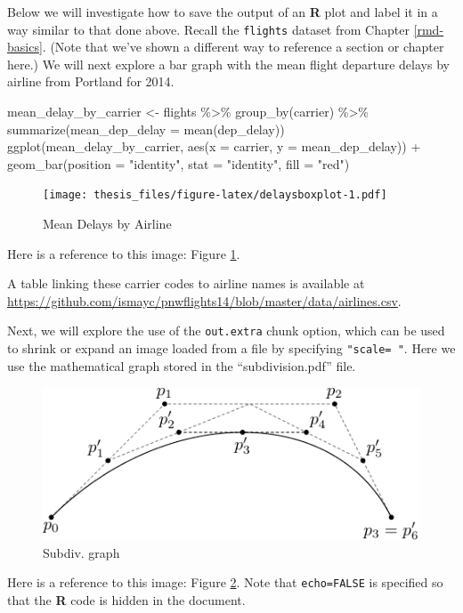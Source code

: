 \documentclass[12pt,twoside]{reedthesis}
\newenvironment{Shaded}{\begin{snugshade}}{\end{snugshade}}
\newcommand{\AttributeTok}[1]{\textcolor[rgb]{0.77,0.63,0.00}{#1}}
\newcommand{\FunctionTok}[1]{\textcolor[rgb]{0.00,0.00,0.00}{#1}}
\newcommand{\NormalTok}[1]{#1}
\newcommand{\OtherTok}[1]{\textcolor[rgb]{0.56,0.35,0.01}{#1}}
\newcommand{\SpecialCharTok}[1]{\textcolor[rgb]{0.00,0.00,0.00}{#1}}
\newcommand{\StringTok}[1]{\textcolor[rgb]{0.31,0.60,0.02}{#1}}
\begin{document}
Below we will investigate how to save the output of an \textbf{R} plot and label it in a way similar to that done above. Recall the \texttt{flights} dataset from Chapter \ref{rmd-basics}. (Note that we've shown a different way to reference a section or chapter here.) We will next explore a bar graph with the mean flight departure delays by airline from Portland for 2014.
\begin{Shaded}
\begin{Highlighting}[]
\NormalTok{mean\_delay\_by\_carrier }\OtherTok{\textless{}{-}}\NormalTok{ flights }\SpecialCharTok{\%\textgreater{}\%}
  \FunctionTok{group\_by}\NormalTok{(carrier) }\SpecialCharTok{\%\textgreater{}\%}
  \FunctionTok{summarize}\NormalTok{(}\AttributeTok{mean\_dep\_delay =} \FunctionTok{mean}\NormalTok{(dep\_delay))}
\FunctionTok{ggplot}\NormalTok{(mean\_delay\_by\_carrier, }\FunctionTok{aes}\NormalTok{(}\AttributeTok{x =}\NormalTok{ carrier, }\AttributeTok{y =}\NormalTok{ mean\_dep\_delay)) }\SpecialCharTok{+}
  \FunctionTok{geom\_bar}\NormalTok{(}\AttributeTok{position =} \StringTok{"identity"}\NormalTok{, }\AttributeTok{stat =} \StringTok{"identity"}\NormalTok{, }\AttributeTok{fill =} \StringTok{"red"}\NormalTok{)}
\end{Highlighting}
\end{Shaded}
\begin{figure}
\centering
\texttt{[image: thesis\_files/figure-latex/delaysboxplot-1.pdf]}
\caption{\label{fig:delaysboxplot}Mean Delays by Airline}
\end{figure}
Here is a reference to this image: Figure \ref{fig:delaysboxplot}.

A table linking these carrier codes to airline names is available at \url{https://github.com/ismayc/pnwflights14/blob/master/data/airlines.csv}.

\clearpage

Next, we will explore the use of the \texttt{out.extra} chunk option, which can be used to shrink or expand an image loaded from a file by specifying \texttt{"scale=\ "}. Here we use the mathematical graph stored in the ``subdivision.pdf'' file.
\begin{figure}
\includegraphics[scale=0.75]{figure/subdivision} \caption{Subdiv. graph}\label{fig:subd}
\end{figure}
Here is a reference to this image: Figure \ref{fig:subd}. Note that \texttt{echo=FALSE} is specified so that the \textbf{R} code is hidden in the document.
\end{document}
